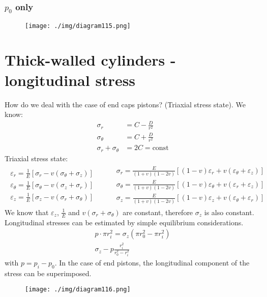 \subsubsection{$p_0$ only}
\begin{figure}[H]
  \centering
  \texttt{[image: ./img/diagram115.png]}
  \caption{}
\end{figure}
\section{Thick-walled cylinders - longitudinal stress}
How do we deal with the case of end caps pistons? (Triaxial stress state). We know:
\begin{align}
  \sigma_r                   & = C - \frac{D}{r^2}   \\
  \sigma_{\theta}            & = C + \frac{D}{r^2}   \\
  \sigma_r + \sigma_{\theta} & = 2C = \textrm{const}
\end{align}
Triaxial stress state:
\begin{gather}
  \begin{array}{l}
    \varepsilon_r = \frac{1}{E}\left[\sigma_{r} - v\left(\sigma_{\theta} + \sigma_z\right)\right]      \\
    \varepsilon_{\theta} = \frac{1}{E}\left[\sigma_{\theta} - v\left(\sigma_z + \sigma_r\right)\right] \\
    \varepsilon_z = \frac{1}{E}\left[\sigma_z - v\left(\sigma_r + \sigma_{\theta}\right)\right]
  \end{array} \hspace{1cm}
  \begin{array}{l}
    \sigma_r = \frac{E}{\left(1+v\right)\left(1-2v\right)} \left[\left(1-v\right)\varepsilon_r + v\left(\varepsilon_{\theta} + \varepsilon_z\right)\right]        \\
    \sigma_{\theta} = \frac{E}{\left(1+v\right)\left(1-2v\right)} \left[\left(1-v\right)\varepsilon_{\theta} + v\left(\varepsilon_r + \varepsilon_z\right)\right] \\
    \sigma_z = \frac{E}{\left(1+v\right)\left(1-2v\right)} \left[\left(1-v\right)\varepsilon_z + v\left(\varepsilon_{\theta} + \varepsilon_r\right)\right]
  \end{array}
\end{gather}
We know that $\varepsilon_z$, $\frac{1}{E}$ and $v\left(\sigma_r + \sigma_{\theta}\right)$ are constant, therefore $\sigma_z$ is also constant. Longitudinal stresses can be estimated by simple equilibrium considerations.
\begin{gather}
  p \cdot \pi r_i^2 = \sigma_z \left(\pi r_0^2 - \pi r_i^2\right)\\
  \sigma_z - p \frac{r_i^2}{r_0^2 - r_i^2}
\end{gather}
with $p = p_i - p_0$. In the case of end pistons, the longitudinal component of the stress can be superimposed.
\begin{figure}[H]
  \centering
  \texttt{[image: ./img/diagram116.png]}
  \caption{}
\end{figure}
